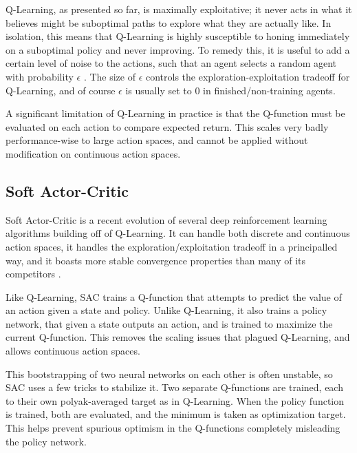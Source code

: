 Q-Learning, as presented so far, is maximally exploitative; it never acts in what it believes might be suboptimal paths to explore what they are actually like. In isolation, this means that Q-Learning is highly susceptible to honing immediately on a suboptimal policy and never improving. To remedy this, it is useful to add a certain level of noise to the actions, such that an agent selects a random agent with probability $\epsilon$ \cite[Chapters 2.2 \& 2.3]{Sutton}. The size of $\epsilon$ controls the exploration-exploitation tradeoff for Q-Learning, and of course $\epsilon$ is usually set to 0 in finished/non-training agents.

A significant limitation of Q-Learning in practice is that the Q-function must be evaluated on each action to compare expected return. This scales very badly performance-wise to large action spaces, and cannot be applied without modification on continuous action spaces.



\subsection{Soft Actor-Critic}

Soft Actor-Critic is a recent evolution of several deep reinforcement learning algorithms building off of Q-Learning. It can handle both discrete and continuous action spaces, it handles the exploration/exploitation tradeoff in a principalled way, and it boasts more stable convergence properties than many of its competitors \cite{SAC_main}.

Like Q-Learning, SAC trains a Q-function that attempts to predict the value of an action given a state and policy. Unlike Q-Learning, it also trains a policy network, that given a state outputs an action, and is trained to maximize the current Q-function. This removes the scaling issues that plagued Q-Learning, and allows continuous action spaces.

This bootstrapping of two neural networks on each other is often unstable, so SAC uses a few tricks to stabilize it. Two separate Q-functions are trained, each to their own polyak-averaged target as in Q-Learning. When the policy function is trained, both are evaluated, and the minimum is taken as optimization target. This helps prevent spurious optimism in the Q-functions completely misleading the policy network.


